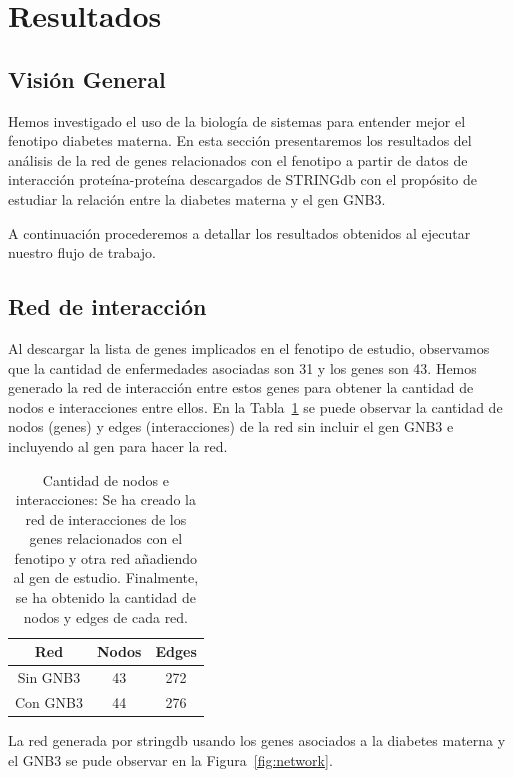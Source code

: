 
\section{Resultados}

\subsection{Visión General}

Hemos investigado el uso de la biología de sistemas para entender mejor el fenotipo diabetes materna. En esta sección presentaremos los resultados del análisis de la red de genes relacionados con el fenotipo a partir de datos de interacción proteína-proteína descargados de STRINGdb con el propósito de estudiar la relación entre la diabetes materna y el gen GNB3.

A continuación procederemos a detallar los resultados obtenidos al ejecutar nuestro flujo de trabajo.

\subsection{Red de interacción}

Al descargar la lista de genes implicados en el fenotipo de estudio, observamos que la cantidad de enfermedades asociadas son 31 y los genes son 43. Hemos generado la red de interacción entre estos genes para obtener la cantidad de nodos e interacciones entre ellos. En la Tabla~\ref{table:nodes_edges_count} se puede observar la cantidad de nodos (genes) y edges (interacciones) de la red sin incluir el gen GNB3 e incluyendo al gen para hacer la red.


\begin{table}[h]
	\centering
	\caption{Cantidad de nodos e interacciones: Se ha creado la red de interacciones de los genes relacionados con el fenotipo y otra red añadiendo al gen de estudio. Finalmente, se ha obtenido la cantidad de nodos y edges de cada red.}
	\label{table:nodes_edges_count}
	\begin{tabular}{|c|c|c|}
		\hline
		\textbf{Red} & \textbf{Nodos} & \textbf{Edges} \\ \hline
		Sin GNB3 & 43    & 272   \\ \hline
		Con GNB3 & 44    & 276  \\ \hline
	\end{tabular}

\end{table}

La red generada por stringdb usando los genes asociados a la diabetes materna y el GNB3 se pude observar en la Figura~\ref{fig:network}.

